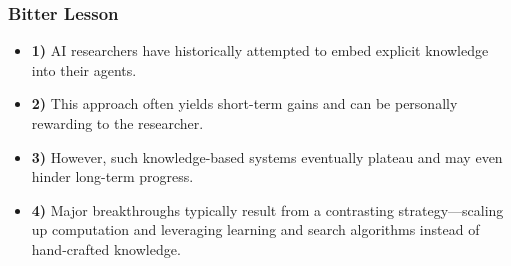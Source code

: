 \subsubsection{Bitter Lesson}
\begin{warning}
    \begin{itemize}
        \item \textbf{1)} AI researchers have historically attempted to embed explicit knowledge into their agents.
        
        \item \textbf{2)} This approach often yields short-term gains and can be personally rewarding to the researcher.
    
        \item \textbf{3)} However, such knowledge-based systems eventually plateau and may even hinder long-term progress.
    
        \item \textbf{4)} Major breakthroughs typically result from a contrasting strategy—scaling up computation and leveraging learning and search algorithms instead of hand-crafted knowledge.
    \end{itemize}    
\end{warning}